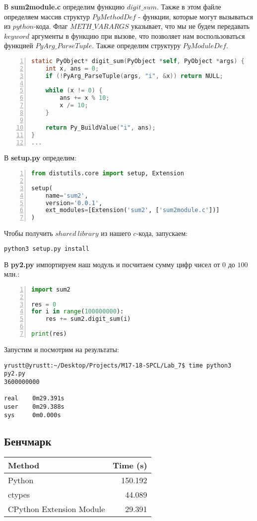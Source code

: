 \documentclass[12pt]{article}
\begin{document}
В \textbf{sum2module.c} определим функцию $digit\_sum$. 
\newline
\newline
Также в этом файле определяем массив структур $PyMethodDef$ - функции, которые могут вызываться из $python$-кода. Флаг $METH\_VARARGS$ указывает, что мы не будем передавать $keyword$ аргументы в функцию при вызове, что позволяет нам воспользоваться функцией $PyArg\_ParseTuple$.
\newline
\newline
Также определим структуру $PyModuleDef$.
\begin{lstlisting}[language=C, xleftmargin=\parindent, frame=L, numbers=left]
static PyObject* digit_sum(PyObject *self, PyObject *args) {
    int x, ans = 0;
    if (!PyArg_ParseTuple(args, "i", &x)) return NULL;

    while (x != 0) {
        ans += x % 10;
        x /= 10;
    }

    return Py_BuildValue("i", ans);
}
...
\end{lstlisting}
В \textbf{setup.py} определим:
\begin{lstlisting}[language=Python, xleftmargin=\parindent, frame=L, numbers=left]
from distutils.core import setup, Extension

setup(
    name='sum2',
    version='0.0.1',
    ext_modules=[Extension('sum2', ['sum2module.c'])]
)
\end{lstlisting}
Чтобы получить $shared\ library$ из нашего $c$-кода, запускаем:
\begin{lstlisting}[language=bash, xleftmargin=\parindent]
python3 setup.py install
\end{lstlisting}
В \textbf{py2.py} импортируем наш модуль и посчитаем сумму цифр чисел от $0$ до $100$ млн.:
\begin{lstlisting}[language=Python, xleftmargin=\parindent, frame=L, numbers=left]
import sum2

res = 0
for i in range(100000000):
    res += sum2.digit_sum(i)

print(res)
\end{lstlisting}
Запустим и посмотрим на результаты:
\begin{lstlisting}
yrustt@yrustt:~/Desktop/Projects/M17-18-SPCL/Lab_7$ time python3 py2.py 
3600000000

real    0m29.391s
user    0m29.388s
sys     0m0.000s
\end{lstlisting}
\newpage
\subsection{Бенчмарк}
\begin{tabular}{|l|r|}
\hline
\textbf{Method} & \textbf{Time (s)} \\
\hline
Python & 150.192 \\
\hline
ctypes & 44.089 \\
\hline
CPython Extension Module & 29.391 \\
\hline
\end{tabular}
\end{document}
